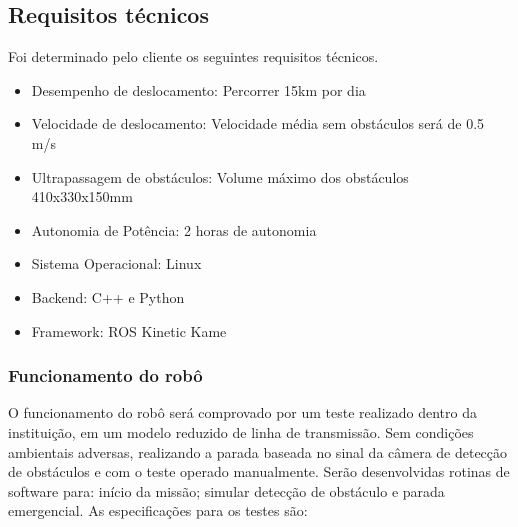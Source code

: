 %
%
%
%

\subsection{Requisitos técnicos}
\label{ssec:reqt}
    Foi determinado pelo cliente os seguintes requisitos técnicos.
\begin{itemize}
	\item Desempenho de deslocamento: Percorrer 15km por dia
	\item Velocidade de deslocamento: Velocidade média sem obstáculos será de 0.5 m/s
	\item Ultrapassagem de obstáculos: Volume máximo dos obstáculos 410x330x150mm
	\item Autonomia de Potência: 2 horas de autonomia
	\item Sistema Operacional: Linux
	\item Backend: C++ e Python
	\item Framework: ROS Kinetic Kame
\end{itemize}

\subsubsection{Funcionamento do robô}
O funcionamento do robô será comprovado por um teste realizado dentro da instituição, em um modelo reduzido de linha de transmissão. Sem condições ambientais adversas, realizando a parada baseada no sinal da câmera de detecção de obstáculos e com o teste operado manualmente. Serão desenvolvidas rotinas de software para: início da missão; simular detecção de obstáculo e parada emergencial. As especificações para os testes são:

